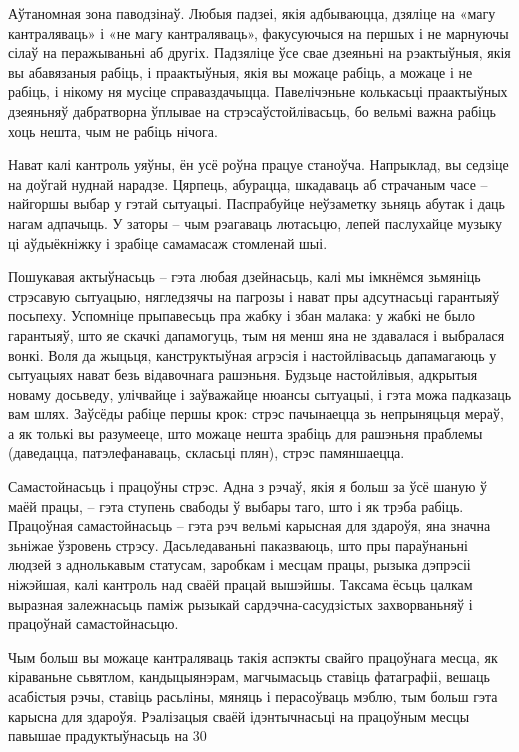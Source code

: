 Аўтаномная зона паводзінаў. Любыя падзеі, якія адбываюцца, дзяліце на «магу кантраляваць» і «не магу кантраляваць», факусуючыся на першых і не марнуючы сілаў на перажываньні аб другіх. Падзяліце ўсе свае дзеяньні на рэактыўныя, якія вы абавязаныя рабіць, і праактыўныя, якія вы можаце рабіць, а можаце і не рабіць, і нікому ня мусіце справаздачыцца. Павелічэньне колькасьці праактыўных дзеяньняў дабратворна ўплывае на стрэсаўстойлівасьць, бо вельмі важна рабіць хоць нешта, чым не рабіць нічога.

Нават калі кантроль уяўны, ён усё роўна працуе станоўча. Напрыклад, вы седзіце на доўгай нуднай нарадзе. Цярпець, абурацца, шкадаваць аб страчаным часе – найгоршы выбар у гэтай сытуацыі. Паспрабуйце неўзаметку зьняць абутак і даць нагам адпачыць. У заторы – чым рэагаваць лютасьцю, лепей паслухайце музыку ці аўдыёкніжку і зрабіце самамасаж стомленай шыі.

Пошукавая актыўнасьць – гэта любая дзейнасьць, калі мы імкнёмся зьмяніць стрэсавую сытуацыю, нягледзячы на пагрозы і нават пры адсутнасьці гарантыяў посьпеху. Успомніце прыпавесьць пра жабку і збан малака: у жабкі не было гарантыяў, што яе скачкі дапамогуць, тым ня менш яна не здавалася і выбралася вонкі. Воля да жыцьця, канструктыўная агрэсія і настойлівасьць дапамагаюць у сытуацыях нават безь відавочнага рашэньня. Будзьце настойлівыя, адкрытыя новаму досьведу, улічвайце і заўважайце нюансы сытуацыі, і гэта можа падказаць вам шлях. Заўсёды рабіце першы крок: стрэс пачынаецца зь непрыняцьця мераў, а як толькі вы разумееце, што можаце нешта зрабіць для рашэньня праблемы (даведацца, патэлефанаваць, скласьці плян), стрэс памяншаецца.

Самастойнасьць і працоўны стрэс. Адна з рэчаў, якія я больш за ўсё шаную ў маёй працы, – гэта ступень свабоды ў выбары таго, што і як трэба рабіць. Працоўная самастойнасьць – гэта рэч вельмі карысная для здароўя, яна значна зьніжае ўзровень стрэсу. Дасьледаваньні паказваюць, што пры параўнаньні людзей з аднолькавым статусам, заробкам і месцам працы, рызыка дэпрэсіі ніжэйшая, калі кантроль над сваёй працай вышэйшы. Таксама ёсьць цалкам выразная залежнасьць паміж рызыкай сардэчна-сасудзістых захворваньняў і працоўнай самастойнасьцю.

Чым больш вы можаце кантраляваць такія аспэкты свайго працоўнага месца, як кіраваньне сьвятлом, кандыцыянэрам, магчымасьць ставіць фатаграфіі, вешаць асабістыя рэчы, ставіць расьліны, мяняць і перасоўваць мэблю, тым больш гэта карысна для здароўя. Рэалізацыя сваёй ідэнтычнасьці на працоўным месцы павышае прадуктыўнасьць на 30%

